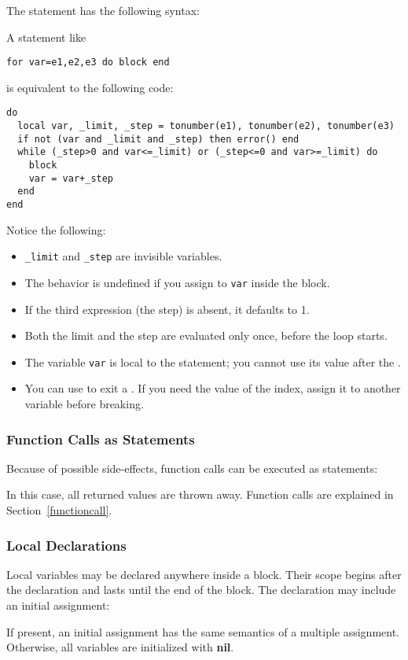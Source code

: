\documentclass[11pt]{article}
\newcommand{\See}[1]{Section~\ref{#1}}
\newcommand{\nil}{{\bf nil}}
\newcommand{\Index}[1]{#1\index{#1}}
\begin{document}
The  statement has the following syntax:
\begin{Produc}
\end{Produc}
A  statement like
\begin{verbatim}
for var=e1,e2,e3 do block end
\end{verbatim}
is equivalent to the following code:
\begin{verbatim}
do
  local var, _limit, _step = tonumber(e1), tonumber(e2), tonumber(e3)
  if not (var and _limit and _step) then error() end
  while (_step>0 and var<=_limit) or (_step<=0 and var>=_limit) do
    block
    var = var+_step
  end
end
\end{verbatim}
Notice the following:
\begin{itemize}
\item \verb|_limit| and \verb|_step| are invisible variables.
\item The behavior is undefined if you assign to \verb|var| inside
the block.
\item If the third expression (the step) is absent, it defaults to 1.
\item Both the limit and the step are evaluated only once,
before the loop starts.
\item The variable \verb|var| is local to the statement;
you cannot use its value after the .
\item You can use  to exit a .
If you need the value of the index,
assign it to another variable before breaking.
\end{itemize}

\subsubsection{Function Calls as Statements} \label{funcstat}
Because of possible side-effects,
function calls can be executed as statements:
\begin{Produc}
\end{Produc}%
In this case, all returned values are thrown away.
Function calls are explained in \See{functioncall}.

\subsubsection{Local Declarations} \label{localvar}
\Index{Local variables} may be declared anywhere inside a block.
Their scope begins after the declaration and lasts until the
end of the block.
The declaration may include an initial assignment:
\begin{Produc}
\end{Produc}%
If present, an initial assignment has the same semantics
of a multiple assignment.
Otherwise, all variables are initialized with \nil.
\end{document}
